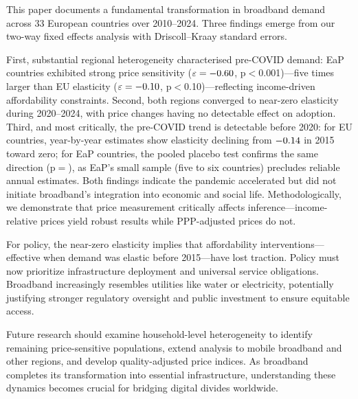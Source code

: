 This paper documents a fundamental transformation in broadband demand across 33 European countries over 2010--2024. Three findings emerge from our two-way fixed effects analysis with Driscoll--Kraay standard errors.

First, substantial regional heterogeneity characterised pre-COVID demand: EaP countries exhibited strong price sensitivity ($\varepsilon = -0.60$, p$<$0.001)---five times larger than EU elasticity ($\varepsilon = -0.10$, p$<$0.10)---reflecting income-driven affordability constraints. Second, both regions converged to near-zero elasticity during 2020--2024, with price changes having no detectable effect on adoption. Third, and most critically, the pre-COVID trend is detectable before 2020: for EU countries, year-by-year estimates show elasticity declining from $-0.14$ in 2015 toward zero; for EaP countries, the pooled placebo test confirms the same direction (p$=$\PlaceboEaPPval), as EaP's small sample (five to six countries) precludes reliable annual estimates. Both findings indicate the pandemic accelerated but did not initiate broadband's integration into economic and social life. Methodologically, we demonstrate that price measurement critically affects inference---income-relative prices yield robust results while PPP-adjusted prices do not.

For policy, the near-zero elasticity implies that affordability interventions---effective when demand was elastic before 2015---have lost traction. Policy must now prioritize infrastructure deployment and universal service obligations. Broadband increasingly resembles utilities like water or electricity, potentially justifying stronger regulatory oversight and public investment to ensure equitable access.

Future research should examine household-level heterogeneity to identify remaining price-sensitive populations, extend analysis to mobile broadband and other regions, and develop quality-adjusted price indices. As broadband completes its transformation into essential infrastructure, understanding these dynamics becomes crucial for bridging digital divides worldwide.
